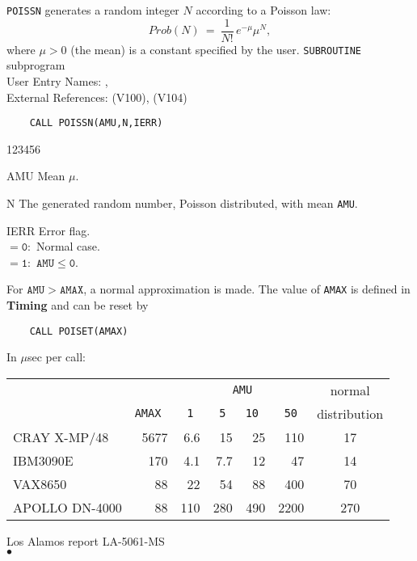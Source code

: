                                
                            
\Submitter{}                                   
{\tt POISSN} generates a random integer $N$ according to a Poisson law:
$$ Prob(N) \ = \ \displaystyle \frac{1}{N!} \, e^{-\mu} \mu^N, $$
where $\mu > 0$ (the mean) is a constant specified by the user.
\Structure
{\tt SUBROUTINE} subprogram \\
User Entry Names: , \\
External References:  (V100),  (V104)
\Usage
\begin{verbatim}
    CALL POISSN(AMU,N,IERR)
\end{verbatim}
\begin{DLtt}{123456}
\item[AMU] Mean $\mu$.
\item[N] The generated random number, Poisson distributed, with mean
{\tt AMU}.
\item[IERR] Error flag. \\
$\mathtt{= 0:}$ Normal case.  \\
$\mathtt{= 1:}$ $\mathtt{AMU \leq 0}$.
\end{DLtt}
For $\mathtt{AMU > AMAX}$, a normal approximation is made. The value of
{\tt AMAX} is defined in {\bf Timing} and can be reset by
\begin{verbatim}
    CALL POISET(AMAX)
\end{verbatim}
\Timing
In $\mu$sec per call:
\begin{center}\begin{tabular}{|l||r||r|r|r|r|c|}
\cline{3-7}
\multicolumn{2}{c}{}        & \multicolumn{4}{|c|}{{\tt AMU}} & normal
 \\ \cline{2-6}
\multicolumn{1}{c||}{}    &\tt AMAX  & \tt  1  & \tt 5  &\tt 10 &\tt 50 &
distribution\\
\hline
CRAY X-MP/48     & 5677     &  6.6    &    15  &   25  & 110   &
17 \\
IBM3090E         & 170      &  4.1    &   7.7  &  12   &  47   &
14 \\
VAX8650          &   88     &  22     &   54   &  88   & 400   &
70 \\
APOLLO DN-4000   & 88       & 110     & 280    &  490  & 2200  &
270  \\ \hline
\end{tabular}\end{center}
\Source
Los Alamos report LA-5061-MS
\\ $\bullet$
